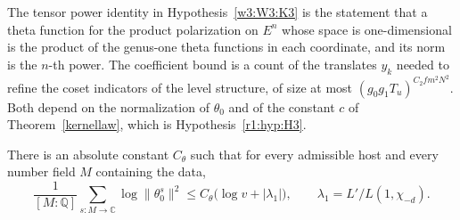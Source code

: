 The tensor power identity in Hypothesis~\ref{w3:W3:K3} is the statement that a theta function for the product polarization on $E^n$ whose space is one-dimensional is the product of the genus-one theta functions in each coordinate, and its norm is the $n$-th power. The coefficient bound is a count of the translates $y_k$ needed to refine the coset indicators of the level structure, of size at most $(g_0g_1T_u)^{C_2fm^2N^2}$. Both depend on the normalization of $\theta_0$ and of the constant $c$ of Theorem~\ref{kernellaw}, which is Hypothesis~\ref{r1:hyp:H3}. 

\begin{hypothesis}\label{w3:W3:K4}
There is an absolute constant $C_{\theta}$ such that for every admissible host and every number field $M$ containing the data,
\[
\frac1{[M:\mathbb Q]}\sum_{s\colon M\to\mathbb C}\log\lVert\theta_0^{s}\rVert^2\le C_\theta\big(\log v+\lvert\lambda_1\rvert\big),\qquad\lambda_1=L'/L(1,\chi_{-d}).
\]
\end{hypothesis}

